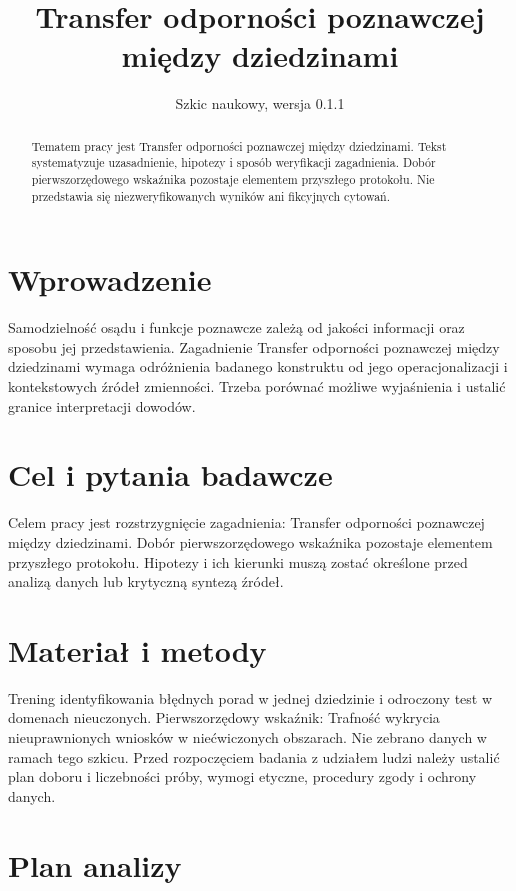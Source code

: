 \documentclass[11pt,a4paper]{article}
\title{Transfer odporności poznawczej między dziedzinami}
\author{}
\date{Szkic naukowy, wersja 0.1.1}
\begin{document}
\maketitle

\begin{abstract}

Tematem pracy jest Transfer odporności poznawczej między dziedzinami. Tekst systematyzuje uzasadnienie, hipotezy i sposób weryfikacji zagadnienia. Dobór pierwszorzędowego wskaźnika pozostaje elementem przyszłego protokołu. Nie przedstawia się niezweryfikowanych wyników ani fikcyjnych cytowań.

\end{abstract}

\section{Wprowadzenie}

Samodzielność osądu i funkcje poznawcze zależą od jakości informacji oraz sposobu jej przedstawienia. Zagadnienie Transfer odporności poznawczej między dziedzinami wymaga odróżnienia badanego konstruktu od jego operacjonalizacji i kontekstowych źródeł zmienności. Trzeba porównać możliwe wyjaśnienia i ustalić granice interpretacji dowodów.

\section{Cel i pytania badawcze}

Celem pracy jest rozstrzygnięcie zagadnienia: Transfer odporności poznawczej między dziedzinami. Dobór pierwszorzędowego wskaźnika pozostaje elementem przyszłego protokołu. Hipotezy i ich kierunki muszą zostać określone przed analizą danych lub krytyczną syntezą źródeł.

\section{Materiał i metody}

Trening identyfikowania błędnych porad w jednej dziedzinie i odroczony test w domenach nieuczonych. Pierwszorzędowy wskaźnik: Trafność wykrycia nieuprawnionych wniosków w niećwiczonych obszarach. Nie zebrano danych w ramach tego szkicu. Przed rozpoczęciem badania z udziałem ludzi należy ustalić plan doboru i liczebności próby, wymogi etyczne, procedury zgody i ochrony danych.

\section{Plan analizy}
\end{document}
